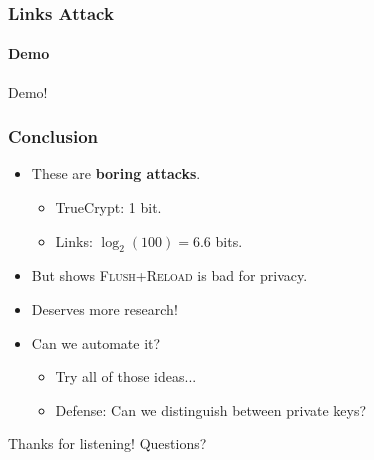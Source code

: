 \documentclass{beamer}
\begin{document}
\begin{frame}
    \frametitle{Links Attack}
    \framesubtitle{Demo}

    \begin{center}
    {\Large Demo!}
    \end{center}
\end{frame}



\begin{frame}
    \frametitle{Conclusion}

    \begin{itemize}
        \item These are \textbf{boring attacks}.
        \begin{itemize}
            \item TrueCrypt: 1 bit.
            \item Links: $\log_2(100) = 6.6$ bits.
        \end{itemize}
        \item But shows \textsc{Flush+Reload} is bad for privacy.
        \item Deserves more research!
        \item Can we automate it?
            \begin{itemize}
                \item Try all of those ideas...
                \item Defense: Can we distinguish between private keys?
            \end{itemize}
    \end{itemize}
\end{frame}

\begin{frame}
    Thanks for listening! Questions?
\end{frame}
\end{document}
